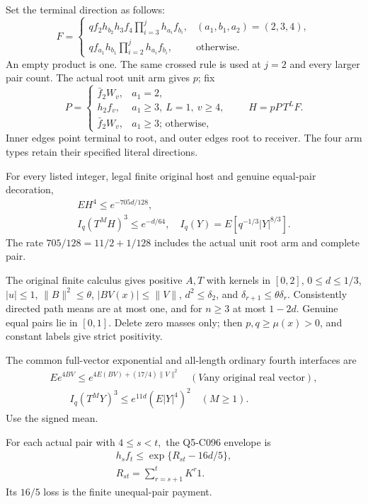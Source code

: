 Set the terminal direction as follows:
\[
F=\begin{cases}
qf_2h_{b_2}h_3f_4\prod_{i=3}^jh_{a_i}f_{b_i},
 &(a_1,b_1,a_2)=(2,3,4),\\
qf_{a_1}h_{b_1}\prod_{i=2}^jh_{a_i}f_{b_i},&\text{otherwise}.
\end{cases}                                                    \tag{C177.T184.1}
\]
An empty product is one. The same crossed rule is used at \(j=2\) and every larger pair count. The actual root unit arm gives \(p\); fix
\[
P=\begin{cases}\bar f_2W_v,&a_1=2,\\
h_2f_v,&a_1\ge3,\ L=1,\ v\ge4,\\
\bar f_2W_v,&a_1\ge3\text{; otherwise},\end{cases}
\qquad H=pP\,T^LF.                                          \tag{C177.T184.2}
\]
Inner edges point terminal to root, and outer edges root to receiver. The four arm types retain their specified literal directions. 

For every listed integer, legal finite original host and genuine equal-pair decoration,
\[
\boxed{\begin{gathered}
EH^4\le e^{-705d/128},\qquad\\
I_q(T^MH)^3\le e^{-d/64},\quad I_q(Y)=E[q^{-1/3}|Y|^{8/3}].
\end{gathered}}\tag{C177.T184.3}
\]
The rate \(705/128=11/2+1/128\) includes the actual unit root arm and complete pair.


The original finite calculus gives positive \(A,\allowbreak \allowbreak  T\) with kernels in \([0,\allowbreak \allowbreak  2]\), \(0\le d\le1/3\), \(|u|\le1\), \(\|B\|^2\le\theta\), \(|BV(x)|\le\|V\|\), \(d^2\le \delta_2\), and \(\delta_{r+1}\le\theta \delta_r\). Consistently directed path means are at most one, and for \(n\ge3\) at most \(1-2d\). Genuine equal pairs lie in \([0,\allowbreak \allowbreak  1]\). Delete zero masses only; then \(p,\allowbreak \allowbreak  q\ge\mu(x)>0\), and constant labels give strict positivity.

The common full-vector exponential and all-length ordinary fourth interfaces are
\[
\begin{gathered}
Ee^{4BV}\le e^{4E(BV)+(17/4)\|V\|^2}\quad(V\text{any original real vector}),\\
\qquad I_q(T^MY)^3\le e^{11d}(E|Y|^4)^2\quad(M\ge1).
\end{gathered}\tag{C177.T184.4}
\]
Use the signed mean.

For each actual pair with \(4\le s<t,\allowbreak \) the Q5-C096 envelope is
\[
\begin{gathered}
h_sf_t\le\exp\{R_{st}-16d/5\},\qquad\\
R_{st}=\sum_{r=s+1}^tK^r1.
\end{gathered}\tag{C177.T184.5}
\]
Its \(16/5\) loss is the finite unequal-pair payment.

